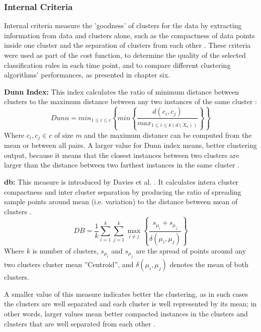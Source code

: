 \subsubsection{Internal Criteria}
Internal criteria measure the 'goodness' of clusters for the data by extracting information from data and clusters alone, such as the compactness of data points inside one cluster and the separation of clusters from each other \cite{Rendon2011}. These criteria were used as part of the cost function, to determine the quality of the selected classification rules in each time point, and to compare different clustering algorithms' performances, as presented in chapter six.


\textbf{Dunn Index: }
This index calculates the ratio of minimum distance between clusters to the maximum distance between any two instances of the same cluster \cite{Dunn1973}:
\begin{equation*}
Dunn = min_{1\leqslant i \leqslant c} \left \{ min \left \{ \frac{d(c_i, c_j)}{max_{1\leqslant i \leqslant k(d(X_k))}} \right \} \right \}
\end{equation*}
Where $c_i, c_j \in c$ of size $m$ and the maximum distance can be computed from the mean or between all pairs. A larger value for Dunn index means, better clustering output, because it means that the closest instances between two clusters are larger than the distance between two farthest instances in the same cluster \cite{Zaki2014}.


\textbf{\acrfull{db}:}
This measure is introduced by Davies et al. \cite{Davies1979a}. It calculates intera cluster compactness and inter cluster separation by producing the ratio of spreading sample points around mean (i.e. variation) to the distance between mean of clusters \cite{Rendon2011}. 
\begin{equation*}
DB = \frac{1}{k} \sum_{i=1}^{k}\sum_{j=1}^{k}\max_{i\neq j }\left \{ \frac{s_{\mu_i} + s_{\mu_j}}{\delta(\mu_i, \mu_j)} \right \}
\end{equation*}
Where $k$ is number of clusters, $ s_{\mu_i}$ and $s_{\mu_j} $ are the spread of points around any two clusters cluster mean ''Centroid'', and $\delta(\mu_i, \mu_j)$ denotes the mean of both clusters.

A smaller value of this measure indicates better the clustering, as in such cases the clusters are well separated and each cluster is well represented by its mean; in other words, larger values mean better compacted instances in the clusters and clusters that are well separated from each other \cite{Zaki2014}.


